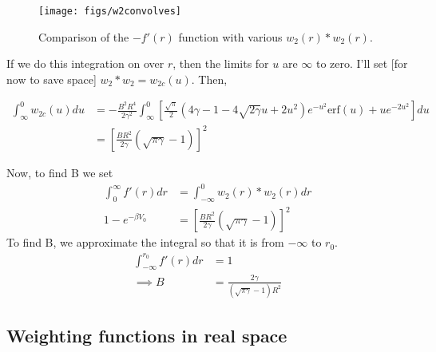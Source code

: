 \documentclass[letterpaper,twocolumn,amsmath,amssymb,prb]{revtex4-1}
\newcommand{\red}[1]{{\color{red} #1}}
\newcommand{\fixme}[1]{\red{[#1]}}
\begin{document}
\begin{figure}
\begin{center}
\texttt{[image: figs/w2convolves]}
\end{center}
\caption{Comparison of the $-f'(r)$ function with various $w_2(r)\ast
  w_2(r)$.}
\label{fig:w2convolves}
\end{figure}

If we do this integration on over $r$, then the limits for $u$ are
$\infty$ to zero.  I'll set \fixme{for now to save space} $w_2\ast
w_2 = w_{2c}(u)$. Then,
\begin{widetext}
\begin{align}
\int_{\infty}^0 w_{2c}(u) du &= -\frac{B^2 R^4}{2 \gamma^2}
           \int_\infty^0 \left[ \frac{\sqrt{\pi}}{2} \left( 4\gamma - 1 -
           4\sqrt{2\gamma}u + 2 u^2 \right) e^{-u^2} \textrm{erf}(u) +
           u e^{-2u^2} \right]du \\
           &= \left[ \frac{B R^2}{2\gamma} (\sqrt{\pi \gamma} -1) \right]^2
\end{align}
\end{widetext}
Now, to find B we set
\begin{align}
  \int_0^{\infty} f'(r)dr &= \int_{-\infty}^0 w_2(r)\ast w_2(r) dr\\
   1 - e^{-\beta V_0} &= \left[ \frac{B R^2}{2\gamma} (\sqrt{\pi
      \gamma} -1)  \right]^2
 \end{align}
To find B, we approximate the integral so that it is from $-\infty$ to $r_0$.
\begin{align}
  \int_{-\infty}^{r_0} f'(r)dr &= 1 \\
  \implies B &= \frac{2\gamma}{(\sqrt{\pi \gamma}-1)R^2}
\end{align}

\subsection{Weighting functions in real space}
\end{document}
